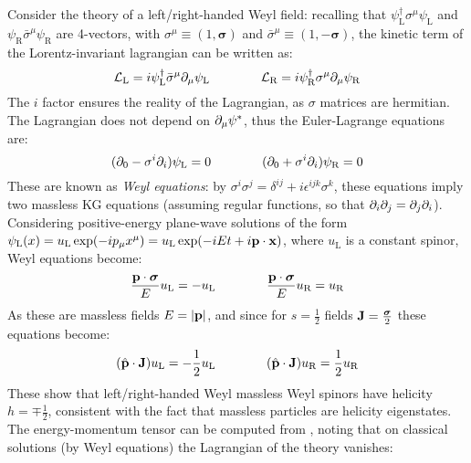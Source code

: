 Consider the theory of a left/right-handed Weyl field: recalling that $ \psi_\text{L}^\dagger \sigma^\mu \psi_\text{L} $ and $ \psi_\text{R} \bar{\sigma}^\mu \psi_\text{R} $ are 4-vectors, with $ \sigma^\mu \equiv (1, \boldsymbol{\sigma}) $ and $ \bar{\sigma}^\mu \equiv (1, - \boldsymbol{\sigma}) $, the kinetic term of the Lorentz-invariant lagrangian can be written as:
\begin{equation}
  \mathcal{L}_\text{L} = i \psi_\text{L}^\dagger \bar{\sigma}^\mu \partial_\mu \psi_\text{L}
  \qquad \qquad
  \mathcal{L}_\text{R} = i \psi_\text{R}^\dagger \sigma^\mu \partial_\mu \psi_\text{R}
\end{equation}
The $ i $ factor ensures the reality of the Lagrangian, as $ \sigma $ matrices are hermitian. The Lagrangian does not depend on $ \partial_\mu \psi^* $, thus the Euler-Lagrange equations are:
\begin{equation}
  (\partial_0 - \sigma^i \partial_i) \psi_\text{L} = 0
  \qquad \qquad
  (\partial_0 + \sigma^i \partial_i) \psi_\text{R} = 0
\end{equation}
These are known as \textit{Weyl equations}: by $ \sigma^i \sigma^j = \delta^{ij} + i \epsilon^{ijk} \sigma^k $, these equations imply two massless KG equations (assuming regular functions, so that $ \partial_i \partial_j = \partial_j \partial_i $). Considering positive-energy plane-wave solutions of the form $ \psi_\text{L}(x) = u_\text{L} \exp(-i p_\mu x^\mu) = u_\text{L} \exp(-i E t + i \mathbf{p} \cdot \mathbf{x}) $, where $ u_\text{L} $ is a constant spinor, Weyl equations become:
\begin{equation*}
  \frac{\mathbf{p} \cdot \boldsymbol{\sigma}}{E} u_\text{L} = - u_\text{L}
  \qquad \qquad
  \frac{\mathbf{p} \cdot \boldsymbol{\sigma}}{E} u_\text{R} = u_\text{R}
\end{equation*}
As these are massless fields $ E = \left\lvert\mathbf{p}\right\rvert $, and since for $ s = \frac{1}{2} $ fields $ \mathbf{J} = \frac{\boldsymbol{\sigma}}{2} $ these equations become:
\begin{equation*}
  (\hat{\mathbf{p}} \cdot \mathbf{J}) u_\text{L} = - \frac{1}{2} u_\text{L}
  \qquad \qquad
  (\hat{\mathbf{p}} \cdot \mathbf{J}) u_\text{R} = \frac{1}{2} u_\text{R}
\end{equation*}
These show that left/right-handed Weyl massless Weyl spinors have helicity $ h = \mp \frac{1}{2} $, consistent with the fact that massless particles are helicity eigenstates.\\
The energy-momentum tensor can be computed from , noting that on classical solutions (by Weyl equations) the Lagrangian of the theory vanishes:
